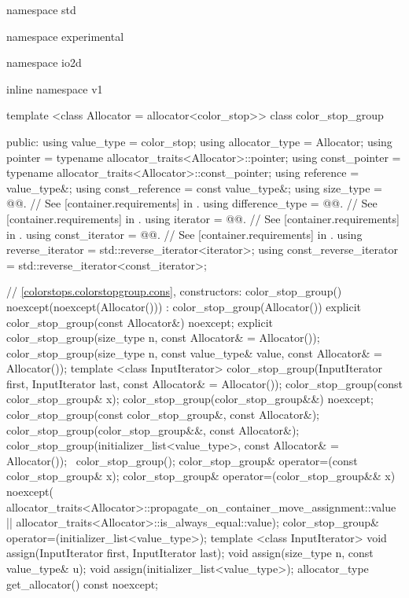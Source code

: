 \begin{codeblock}
namespace std { namespace experimental { namespace io2d { inline namespace v1 {
  template <class Allocator = allocator<color_stop>>
  class color_stop_group {
  public:
    using value_type      = color_stop;
    using allocator_type  = Allocator;
    using pointer = typename allocator_traits<Allocator>::pointer;
    using const_pointer = typename allocator_traits<Allocator>::const_pointer;
    using reference = value_type&;
    using const_reference = const value_type&;
    using size_type       = @@. // See [container.requirements] in \cppseventeen.
    using difference_type = @@. // See [container.requirements] in \cppseventeen.
    using iterator        = @@. // See [container.requirements] in \cppseventeen.
    using const_iterator  = @@. // See [container.requirements] in \cppseventeen.
    using reverse_iterator       = std::reverse_iterator<iterator>;
    using const_reverse_iterator = std::reverse_iterator<const_iterator>;

    // \ref{colorstops.colorstopgroup.cons}, constructors:    
    color_stop_group() noexcept(noexcept(Allocator())) :
    color_stop_group(Allocator()) { }
    explicit color_stop_group(const Allocator&) noexcept;
    explicit color_stop_group(size_type n, const Allocator& = Allocator());
    color_stop_group(size_type n, const value_type& value,
      const Allocator& = Allocator());
    template <class InputIterator>
    color_stop_group(InputIterator first, InputIterator last,
    const Allocator& = Allocator());
    color_stop_group(const color_stop_group& x);
    color_stop_group(color_stop_group&&) noexcept;
    color_stop_group(const color_stop_group&, const Allocator&);
    color_stop_group(color_stop_group&&, const Allocator&);
    color_stop_group(initializer_list<value_type>,
      const Allocator& = Allocator());
    ~color_stop_group();
    color_stop_group& operator=(const color_stop_group& x);
    color_stop_group& operator=(color_stop_group&& x)
      noexcept(
      allocator_traits<Allocator>::propagate_on_container_move_assignment::value
      || allocator_traits<Allocator>::is_always_equal::value);
    color_stop_group& operator=(initializer_list<value_type>);
    template <class InputIterator>
    void assign(InputIterator first, InputIterator last);
    void assign(size_type n, const value_type& u);
    void assign(initializer_list<value_type>);
    allocator_type get_allocator() const noexcept;
    
}}}}}
\end{codeblock}
